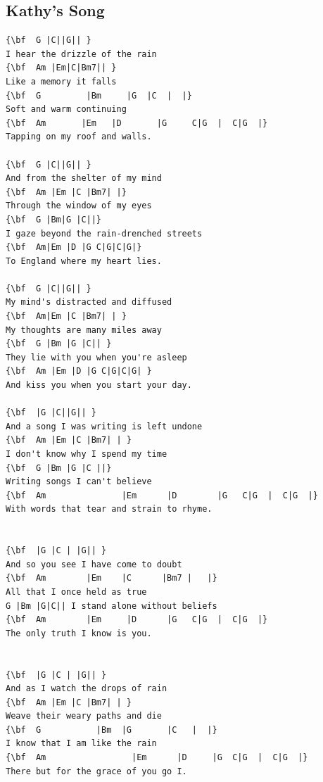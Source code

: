 \documentclass[a4paper]{article}
\begin{document}
\subsection{Kathy's Song}
\begin{Verbatim}[commandchars=\\\{\}]
{\bf  G |C||G|| }
I hear the drizzle of the rain
{\bf  Am |Em|C|Bm7|| }
Like a memory it falls
{\bf  G         |Bm     |G  |C  |  |}
Soft and warm continuing
{\bf  Am       |Em   |D       |G     C|G  |  C|G  |}
Tapping on my roof and walls.

{\bf  G |C||G|| }
And from the shelter of my mind
{\bf  Am |Em |C |Bm7| |}
Through the window of my eyes
{\bf  G |Bm|G |C||}
I gaze beyond the rain-drenched streets 
{\bf  Am|Em |D |G C|G|C|G|}
To England where my heart lies.

{\bf  G |C||G|| }
My mind's distracted and diffused
{\bf  Am|Em |C |Bm7| | }
My thoughts are many miles away
{\bf  G |Bm |G |C|| }
They lie with you when you're asleep
{\bf  Am |Em |D |G C|G|C|G| }
And kiss you when you start your day.

{\bf  |G |C||G|| }
And a song I was writing is left undone
{\bf  Am |Em |C |Bm7| | }
I don't know why I spend my time
{\bf  G |Bm |G |C ||}
Writing songs I can't believe
{\bf  Am               |Em      |D        |G   C|G  |  C|G  |}
With words that tear and strain to rhyme.


{\bf  |G |C | |G|| }
And so you see I have come to doubt
{\bf  Am        |Em    |C      |Bm7 |   |}
All that I once held as true
G |Bm |G|C|| I stand alone without beliefs
{\bf  Am        |Em     |D      |G   C|G  |  C|G  |}
The only truth I know is you.


{\bf  |G |C | |G|| }
And as I watch the drops of rain
{\bf  Am |Em |C |Bm7| | }
Weave their weary paths and die
{\bf  G           |Bm  |G       |C   |  |}
I know that I am like the rain
{\bf  Am                 |Em      |D     |G  C|G  |  C|G  |}
There but for the grace of you go I.

\end{Verbatim}
\newpage
\end{document}
